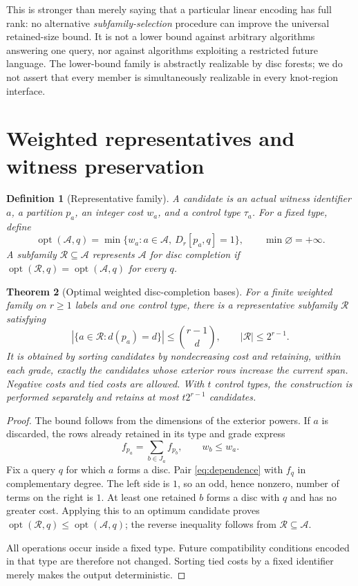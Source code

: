 \documentclass[11pt,a4paper]{article}
\newtheorem{theorem}{Theorem}[section]
\newtheorem{definition}[theorem]{Definition}
\theoremstyle{remark}\newtheorem{remark}[theorem]{Remark}
\newcommand{\opt}{\operatorname{opt}}
\newcommand{\R}{\mathcal R}
\newcommand{\A}{\mathcal A}
\begin{document}
This is stronger than merely saying that a particular linear encoding has full rank: no alternative \emph{subfamily-selection} procedure can improve the universal retained-size bound. It is not a lower bound against arbitrary algorithms answering one query, nor against algorithms exploiting a restricted future language. The lower-bound family is abstractly realizable by disc forests; we do not assert that every member is simultaneously realizable in every knot-region interface.

\section{Weighted representatives and witness preservation}\label{sec:weighted}
\begin{definition}[Representative family]
A candidate is an actual witness identifier $a$, a partition $p_a$, an integer cost $w_a$, and a control type $\tau_a$. For a fixed type, define
\[
 \opt(\A,q)=\min\{w_a:a\in\A,\ D_r[p_a,q]=1\},
 \qquad \min\varnothing=+\infty.
\]
A subfamily $\R\subseteq\A$ represents $\A$ for disc completion if $\opt(\R,q)=\opt(\A,q)$ for every $q$.
\end{definition}

\begin{theorem}[Optimal weighted disc-completion bases]\label{thm:weighted}
For a finite weighted family on $r\ge1$ labels and one control type, there is a representative subfamily $\R$ satisfying
\begin{equation}\label{eq:gradebound}
 |\{a\in\R:d(p_a)=d\}|\le\binom{r-1}{d},\qquad |\R|\le2^{r-1}.
\end{equation}
It is obtained by sorting candidates by nondecreasing cost and retaining, within each grade, exactly the candidates whose exterior rows increase the current span. Negative costs and tied costs are allowed. With $t$ control types, the construction is performed separately and retains at most $t2^{r-1}$ candidates.
\end{theorem}
\begin{proof}
The bound follows from the dimensions of the exterior powers. If $a$ is discarded, the rows already retained in its type and grade express
\begin{equation}\label{eq:dependence}
 f_{p_a}=\sum_{b\in J_a}f_{p_b},\qquad w_b\le w_a.
\end{equation}
Fix a query $q$ for which $a$ forms a disc. Pair \eqref{eq:dependence} with $f_q$ in complementary degree. The left side is $1$, so an odd, hence nonzero, number of terms on the right is $1$. At least one retained $b$ forms a disc with $q$ and has no greater cost. Applying this to an optimum candidate proves $\opt(\R,q)\le\opt(\A,q)$; the reverse inequality follows from $\R\subseteq\A$.

All operations occur inside a fixed type. Future compatibility conditions encoded in that type are therefore not changed. Sorting tied costs by a fixed identifier merely makes the output deterministic.
\end{proof}
\end{document}

